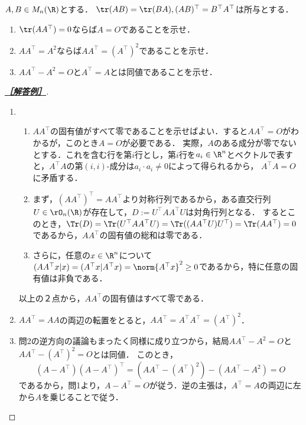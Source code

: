 \documentclass[uplatex,dvipdfmx]{jsarticle}
\begin{document}
\begin{tcolorbox}[colframe=ForestGreen, colback=ForestGreen!10!white,breakable,colbacktitle=ForestGreen!40!white,coltitle=black,fonttitle=\bfseries\sffamily,
    title=第１問]
    \begin{problem}
        $A,B\in M_n(\R)$とする．
        $\tr(AB)=\tr(BA),(AB)^\top=B^\top A^\top$は所与とする．
        \begin{enumerate}[{問}1]
            \item $\tr(AA^\top)=0$ならば$A=O$であることを示せ．
            \item $AA^\top=A^2$ならば$AA^\top=(A^\top)^2$であることを示せ．
            \item $AA^\top-A^2=O$と$A^\top =A$とは同値であることを示せ．
        \end{enumerate}
    \end{problem}
\end{tcolorbox}
\begin{proof}[\textbf{\underline{［解答例］}}]\mbox{}
    \begin{enumerate}
        \item 
        \begin{enumerate}[{Step}1]
            \item $AA^\top$の固有値がすべて零であることを示せばよい．すると$AA^\top=O$がわかるが，このとき$A=O$が必要である．
            実際，$A$のある成分が零でないとする．これを含む行を第$i$行とし，第$i$行を$a_i\in\R^n$とベクトルで表すと，$A^\top A$の第$(i,i)$-成分は$a_i\cdot a_i\ne 0$によって得られるから，
            $A^\top A=O$に矛盾する．
            \item まず，$(AA^\top)^\top=AA^\top$より対称行列であるから，ある直交行列$U\in\rO_n(\R)$が存在して，$D:=U^\top AA^\top U$は対角行列となる．
            するとこのとき，$\Tr(D)=\Tr(U^\top AA^\top U)=\Tr((AA^\top U)U^\top)=\Tr(AA^\top)=0$であるから，$AA^\top$の固有値の総和は零である．
            \item さらに，任意の$x\in\R^n$について$(AA^\top x|x)=(A^\top x|A^\top x)=\norm{A^\top x}^2\ge0$であるから，特に任意の固有値は非負である．
        \end{enumerate}
        以上の２点から，$AA^\top$の固有値はすべて零である．
        \item $AA^\top=AA$の両辺の転置をとると，$AA^\top=A^\top A^\top=(A^\top)^2$．
        \item 問2の逆方向の議論もまったく同様に成り立つから，結局$AA^\top -A^2=O$と$AA^\top-(A^\top)^2=O$とは同値．
        このとき，
        \[(A-A^\top)(A-A^\top)^\top=(AA^\top-(A^\top)^2)-(AA^\top-A^2)=O\]
        であるから，問1より，$A-A^\top=O$が従う．逆の主張は，$A^\top=A$の両辺に左から$A$を乗じることで従う．
    \end{enumerate}
\end{proof}
\end{document}
